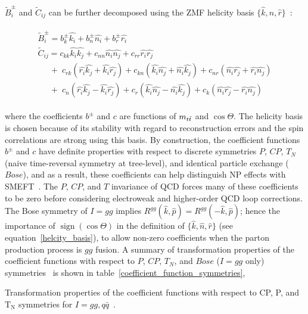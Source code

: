 \begin{refsection}
$\tilde{B}_i^\pm$ and $ \tilde{C}_{ij} $ can be further decomposed using the \ttbar ZMF helicity basis $\{\hat{k},\hat{n},\hat{r}\}$~\cite{Bernreuther}:
\begin{linenomath*}
\begin{align}
\begin{array}{l}
\tilde{B}_i^\pm =  b_k^\pm \hat{k_i} + b_n^\pm \hat{n_i} + b_r^\pm \hat{r_i} \\
\tilde{C}_{ij}  =  c_{kk} \hat{k_i}\hat{k_j} + c_{nn} \hat{n_i}\hat{n_j} + c_{rr} \hat{r_i}\hat{r_j} \\ 
\;\;\;\;\; + \; c_{rk} (\hat{r_i}\hat{k_j} + \hat{k_i}\hat{r_j}) +  c_{kn} (\hat{k_i}\hat{n_j} + \hat{n_i}\hat{k_j})  +  c_{nr} (\hat{n_i}\hat{r_j} + \hat{r_i}\hat{n_j}) \\
\;\;\;\;\; + \; c_{n} (\hat{r_i}\hat{k_j} - \hat{k_i}\hat{r_j}) +  c_{r} (\hat{k_i}\hat{n_j} - \hat{n_i}\hat{k_j})  +  c_{k} (\hat{n_i}\hat{r_j} - \hat{r_i}\hat{n_j})
\end{array}
\label{spin_density_matrix_decomposition_expansion}
\end{align}
\end{linenomath*}
where the coefficients $b^\pm$ and $c$ are functions of $m_{t\bar{t}}$ and $\cos \Theta$.
The helicity basis is chosen because of its stability with regard to reconstruction errors and the spin correlations are strong using this basis.
By construction, the coefficient functions $b^\pm$ and $c$ have definite properties with respect to discrete symmetries $P$, $CP$, $T_N$ (naive time-reversal symmetry at tree-level), and identical particle exchange ($Bose$), and as a result, these coefficients can help distinguish NP effects with SMEFT~\cite{Bernreuther}.
The $P$, $CP$, and $T$ invariance of QCD forces many of these coefficients to be zero before considering electroweak and higher-order QCD loop corrections.
The Bose symmetry of $I = gg$ implies $R^{gg}(\hat{k},\hat{p}) = R^{gg}(-\hat{k},\hat{p})$; hence the importance of $\operatorname{sign}(\cos \Theta)$ in the definition of $\{\hat{k},\hat{n},\hat{r}\}$ (see equation~\ref{helcity_basis}), to allow non-zero coefficients when the parton production process is $gg$ fusion.
A summary of transformation properties of the coefficient functions with respect to $P$, $CP$, $T_N$, and $Bose$ ($I = gg$ only) symmetries~\cite{Bernreuther} is shown in table~\ref{coefficient_function_symmetries}, 
\begin{table}[htb]
\caption{Transformation properties of the coefficient functions with respect to CP, P, and $\mathrm{T_N}$ symmetries for $I = gg, q\bar{q}$~\cite{Bernreuther}. 
}
\end{table}
\end{refsection}
